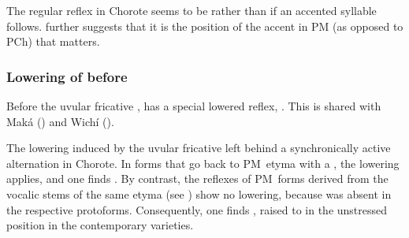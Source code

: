 \begin{exe}
    \ex \burn
    \ex \wing
    \ex \yicaay
    \ex \goawayyou
    \ex \putv
    \ex \flyv
    \ex \tell
    \ex \sisinlaw \label{ch-ae-sisinlaw}
    \ex \soninlaw \label{ch-ae-soninlaw}
    \ex \fieldn
    \ex \rootn \label{ch-ae-rootn}
    \ex \coldweather
    \ex \dreamn
    \ex \crab
    \ex \killbird
    \ex \hole
    \ex \spouse
    \ex \stretchout
    \ex \dividev
    \ex \chaniarf
    \ex \chaniart
    \ex \flu
    \ex \nightmonkey
    \ex \hither
    \ex \smellv
    \ex \tapeti
    \ex \acquainted
    \ex \abdcavity
    \ex \basetrunk
    \ex \trunk
    \ex \bilecw
    \ex \allrcpr
    \ex \burrow
    \ex \walk
    \ex \seev
    \ex \placen
    \ex \egg
    \ex \vrbpl
    \ex \headn
\end{exe}

The regular reflex in Chorote seems to be  rather than  if an accented syllable follows.  further suggests that it is the position of the accent in PM (as opposed to PCh) that matters.

\begin{exe}
    \ex \deep \label{ch-ae-i-deep}
    \ex \cat
    \ex \duraznillo
    \ex \meat
\end{exe}

\subsubsection{Lowering of  before }\label{pm-ch-ejj-ah}

Before the uvular fricative ,  has a special lowered reflex, . This is shared with Maká () and Wichí ().

\begin{exe}
    \ex \fatv
    \ex \jabiru
    \ex \quick
    \ex \smoke
    \ex \fullriver
    \ex \peccary
    \ex \hurt
    \ex \chaguara
    \ex \wildbean
    \ex \mistolf
    \ex \puma
\end{exe}

The lowering induced by the uvular fricative left behind a synchronically active alternation in Chorote. In forms that go back to PM~etyma with a , the lowering applies, and one finds . By contrast, the reflexes of PM~forms derived from the vocalic stems of the same etyma (see ) show no lowering, because  was absent in the respective protoforms. Consequently, one finds , raised to  in the unstressed position in the contemporary varieties.

